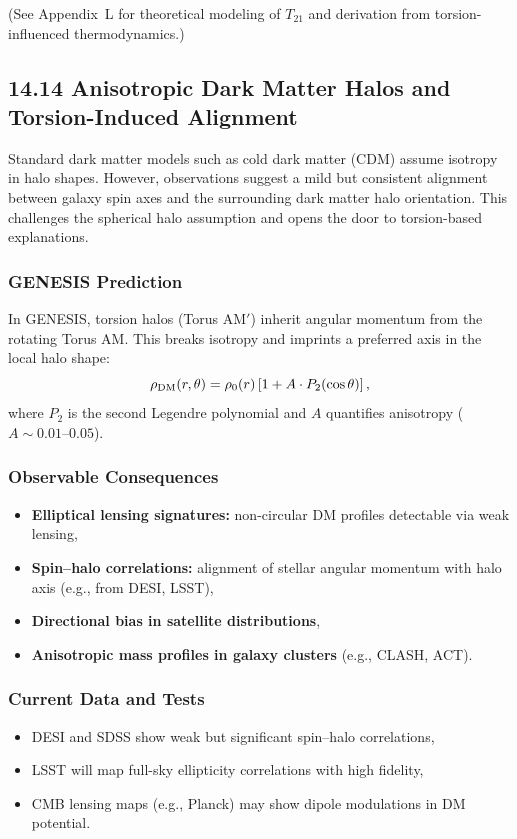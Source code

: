 \documentclass{article}
\begin{document}
(See Appendix~L for theoretical modeling of $T_{21}$ and derivation from torsion-influenced thermodynamics.)


\subsection*{14.14 Anisotropic Dark Matter Halos and Torsion-Induced Alignment}
\label{sec:dm_anisotropy}

Standard dark matter models such as cold dark matter (CDM) assume isotropy in halo shapes. However, observations suggest a mild but consistent alignment between galaxy spin axes and the surrounding dark matter halo orientation. This challenges the spherical halo assumption and opens the door to torsion-based explanations.

\subsubsection*{GENESIS Prediction}
In GENESIS, torsion halos (Torus AM$'$) inherit angular momentum from the rotating Torus AM. This breaks isotropy and imprints a preferred axis in the local halo shape:
\begin{equation}
\rho_{\rm DM}(r, \theta) = \rho_0(r) \left[1 + A \cdot P_2(\cos\theta)\right],
\end{equation}
where $P_2$ is the second Legendre polynomial and $A$ quantifies anisotropy ($A \sim 0.01$–$0.05$).

\subsubsection*{Observable Consequences}
\begin{itemize}
  \item \textbf{Elliptical lensing signatures:} non-circular DM profiles detectable via weak lensing,
  \item \textbf{Spin–halo correlations:} alignment of stellar angular momentum with halo axis (e.g., from DESI, LSST),
  \item \textbf{Directional bias in satellite distributions},
  \item \textbf{Anisotropic mass profiles in galaxy clusters} (e.g., CLASH, ACT).
\end{itemize}

\subsubsection*{Current Data and Tests}
\begin{itemize}
  \item DESI and SDSS show weak but significant spin–halo correlations,
  \item LSST will map full-sky ellipticity correlations with high fidelity,
  \item CMB lensing maps (e.g., Planck) may show dipole modulations in DM potential.
\end{itemize}
\end{document}
